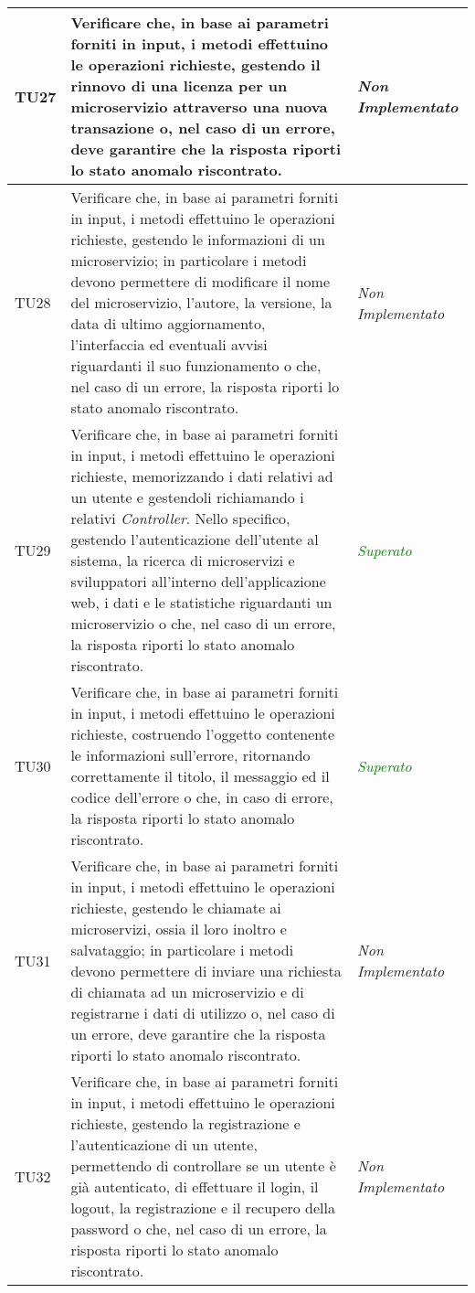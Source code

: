 \begin{longtable}{|>{\centering\arraybackslash}p{1.5cm}|>{\centering\arraybackslash}p{8cm} | >{\centering\arraybackslash}p{3.8cm}|}
		\hypertarget{TU27}{TU27} & Verificare che, in base ai parametri forniti in input, i metodi effettuino le operazioni richieste, gestendo il rinnovo di una licenza per un microservizio attraverso una nuova transazione o, nel caso di un errore, deve garantire che la risposta riporti lo stato anomalo riscontrato. & \textit{Non Implementato}\\ \hline
		\hypertarget{TU28}{TU28} & Verificare che, in base ai parametri forniti in input, i metodi effettuino le operazioni richieste, gestendo le informazioni di un microservizio; in particolare i metodi devono permettere di modificare il nome del microservizio, l'autore, la versione, la data di ultimo aggiornamento, l'interfaccia ed eventuali avvisi riguardanti il suo funzionamento o che, nel caso di un errore, la risposta riporti lo stato anomalo riscontrato. & \textit{Non Implementato}\\ \hline
		\hypertarget{TU29}{TU29} & Verificare che, in base ai parametri forniti in input, i metodi effettuino le operazioni richieste, memorizzando i dati relativi ad un utente e gestendoli richiamando i relativi \textit{Controller}. Nello specifico, gestendo l'autenticazione dell'utente al sistema, la ricerca di microservizi e sviluppatori all'interno dell'applicazione web, i dati e le statistiche riguardanti un microservizio o che, nel caso di un errore, la risposta riporti lo stato anomalo riscontrato. & \textcolor{Green}{\textit{Superato}}\\ \hline
		\hypertarget{TU30}{TU30} & Verificare che, in base ai parametri forniti in input, i metodi effettuino le operazioni richieste, costruendo l’oggetto contenente le informazioni sull'errore, ritornando correttamente il titolo, il messaggio ed il codice dell’errore o che, in caso di errore, la risposta riporti lo stato anomalo riscontrato. & \textcolor{Green}{\textit{Superato}}\\ \hline
		\hypertarget{TU31}{TU31} & Verificare che, in base ai parametri forniti in input, i metodi effettuino le operazioni richieste, gestendo le chiamate ai microservizi, ossia il loro inoltro e salvataggio; in particolare i metodi devono permettere di inviare una richiesta di chiamata ad un microservizio e di registrarne i dati di utilizzo o, nel caso di un errore, deve garantire che la risposta riporti lo stato anomalo riscontrato. & \textit{Non Implementato}\\ \hline
		\hypertarget{TU32}{TU32} & Verificare che, in base ai parametri forniti in input, i metodi effettuino le operazioni richieste, gestendo la registrazione e l'autenticazione di un utente, permettendo di controllare se un utente è già autenticato, di effettuare il login, il logout, la registrazione e il recupero della password o che, nel caso di un errore, la risposta riporti lo stato anomalo riscontrato. & \textit{Non Implementato}\\ \hline

\end{longtable}
